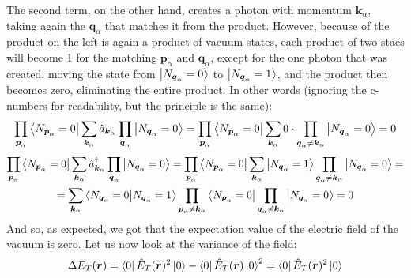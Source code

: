 \documentclass{article}
\begin{document}
The second term, on the other hand, creates a photon with momentum $\boldsymbol{k}_\alpha$, taking again the $\boldsymbol{q}_\alpha$ that matches it from the product. However, because of the product on the left is again a product of vacuum states, each product of two staes will become 1 for the matching $\boldsymbol{p}_\alpha$ and $\boldsymbol{q}_\alpha$, except for the one photon that was created, moving the state from $\ket{N_{\boldsymbol{q}_\alpha}=0}$ to $\ket{N_{\boldsymbol{q}_\alpha}=1}$, and the product then becomes zero, eliminating the entire product. In other words (ignoring the c-numbers for readability, but the principle is the same):
\begin{equation}
    \prod_{\boldsymbol{p}_\alpha} \bra{N_{\boldsymbol{p}_\alpha} = 0}
    \sum_{\boldsymbol{k}_\alpha} \hat{a}_{\boldsymbol{k}_\alpha}
    \prod_{\boldsymbol{q}_\alpha} \ket{N_{\boldsymbol{q}_\alpha} = 0} =
    \prod_{\boldsymbol{p}_\alpha} \bra{N_{\boldsymbol{p}_\alpha} = 0}
    \sum_{\boldsymbol{k}_\alpha} 
    0 \cdot
    \prod_{\boldsymbol{q}_\alpha \ne \boldsymbol{k}_\alpha} \ket{N_{\boldsymbol{q}_\alpha} = 0} = 0
\end{equation}
\begin{equation}
\begin{gathered}
    \prod_{\boldsymbol{p}_\alpha} \bra{N_{\boldsymbol{p}_\alpha} = 0}
    \sum_{\boldsymbol{k}_\alpha} \hat{a}_{\boldsymbol{k}_\alpha}^\dagger
    \prod_{\boldsymbol{q}_\alpha} \ket{N_{\boldsymbol{q}_\alpha} = 0} =
    \prod_{\boldsymbol{p}_\alpha} \bra{N_{\boldsymbol{p}_\alpha} = 0}
    \sum_{\boldsymbol{k}_\alpha} 
    \ket{N_{\boldsymbol{q}_\alpha} = 1}
    \prod_{\boldsymbol{q}_\alpha \ne \boldsymbol{k}_\alpha} \ket{N_{\boldsymbol{q}_\alpha} = 0} = \\ =
    \sum_{\boldsymbol{k}_\alpha}
    \braket{N_{\boldsymbol{q}_\alpha} = 0}{N_{\boldsymbol{q}_\alpha} = 1}
    \prod_{\boldsymbol{p}_\alpha \ne \boldsymbol{k}_\alpha} \bra{N_{\boldsymbol{p}_\alpha} = 0}
    \prod_{\boldsymbol{q}_\alpha \ne \boldsymbol{k}_\alpha} \ket{N_{\boldsymbol{q}_\alpha} = 0} = 0
\end{gathered}
\end{equation}
And so, as expected, we got that the expectation value of the electric field of the vacuum is zero. Let us now look at the variance of the field:
\begin{equation}
    \Delta E_T(\boldsymbol{r}) = \bra{0}\hat{E}_T(\boldsymbol{r})^2\ket{0} - \bra{0}\hat{E}_T(\boldsymbol{r})\ket{0}^2 = \bra{0}\hat{E}_T(\boldsymbol{r})^2\ket{0}
\end{equation}
\end{document}

